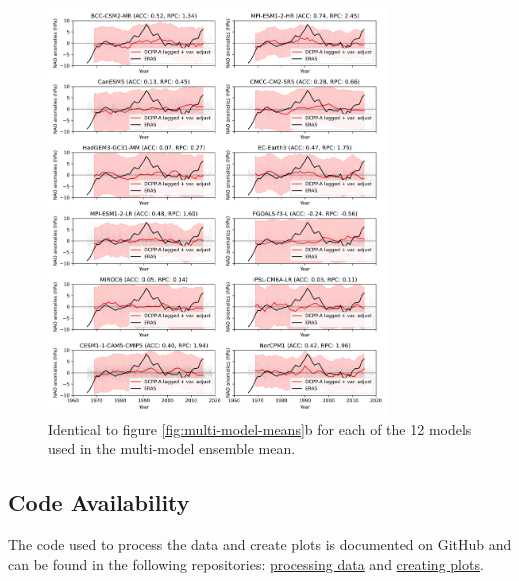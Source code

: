 \documentclass{article}
\begin{document}
\begin{figure}
    \centering
    \includegraphics[width=0.8\textwidth]{plots/nao_lagged_variance_adjusted_ensemble_mean_and_individual_members_subplots.png}
    \caption{Identical to figure \ref*{fig:multi-model-means}b for each of the 12 models used in the multi-model ensemble mean.}
    \label{fig:ind-models-lag-adjust}
\end{figure}

\subsection*{Code Availability}

The code used to process the data and create plots is documented on GitHub and can be found in the following repositories: \href{https://github.com/benhutchmet/testing-batch-processing}{processing data} and \href{https://github.com/benhutchmet/multi-model-jasmin}{creating plots}.

\end{document}
